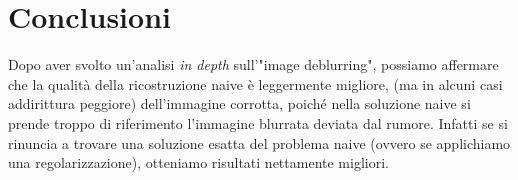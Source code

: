 \section{Conclusioni}
Dopo aver svolto un'analisi \textit{in depth} sull'"image deblurring", possiamo
 affermare che la qualità della ricostruzione naive è leggermente migliore,
 (ma in alcuni casi addirittura peggiore) dell'immagine corrotta, poiché nella
 soluzione naive si prende troppo di riferimento l'immagine blurrata deviata
 dal rumore. Infatti se si rinuncia a trovare una soluzione esatta del problema
 naive (ovvero se applichiamo una regolarizzazione),
 otteniamo risultati nettamente migliori.
